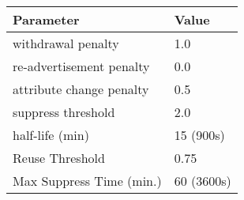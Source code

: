 \begin{center}
	\begin{tabular}{ || m{5cm}| m{2cm} || }
	\hline
	Parameter & Value \\
	\hline \hline
	withdrawal penalty & 1.0 \\
	\hline
    re-advertisement penalty & 0.0 \\
	\hline
    attribute change penalty & 0.5 \\
	\hline
    suppress threshold & 2.0 \\
	\hline
    half-life (min) & 15 (900s) \\
	\hline
    Reuse Threshold & 0.75 \\
	\hline
    Max Suppress Time (min.) & 60 (3600s) \\
	\hline
	\end{tabular}
\end{center}
